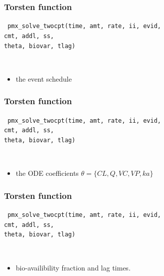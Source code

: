 \documentclass[xcolor=table]{beamer}
\begin{document}
\begin{frame}
  \frametitle{Torsten function}
  
  \texttt{
    pmx\_solve\_twocpt(\textcolor{MRGGreen}{time, amt, rate, ii, evid, \\ 
    \hspace{3.3cm} cmt, addl, ss}, \\
     \hspace{3.3cm} theta, biovar, tlag)
   }
   
   \ \\
   \begin{itemize}
     \item the event schedule
   \end{itemize}

\end{frame}

\begin{frame}
  \frametitle{Torsten function}
  
  \texttt{
    pmx\_solve\_twocpt(time, amt, rate, ii, evid, \\ 
    \hspace{3.3cm} cmt, addl, ss, \\
     \hspace{3.3cm} \textcolor{MRGGreen}{theta}, biovar, tlag)
   }
   
   \ \\
   \begin{itemize}
     \item the ODE coefficients $\theta = \{CL, Q, VC, VP, ka \}$ 
   \end{itemize}
  
\end{frame}

\begin{frame}
  \frametitle{Torsten function}
  
  \texttt{
    pmx\_solve\_twocpt(time, amt, rate, ii, evid, \\ 
    \hspace{3.3cm} cmt, addl, ss, \\
     \hspace{3.3cm} theta, \textcolor{MRGGreen}{biovar, tlag})
   }
   
   \ \\
   \begin{itemize}
     \item bio-availibility fraction and lag times. 
   \end{itemize}
  
\end{frame}
\end{document}

